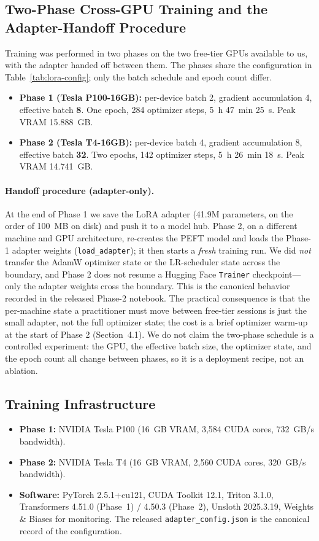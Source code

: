 \documentclass[11pt, a4paper]{article}
\begin{document}
\subsection{Two-Phase Cross-GPU Training and the Adapter-Handoff Procedure}
Training was performed in two phases on the two free-tier GPUs available to us, with the adapter handed off between them. The phases share the configuration in Table~\ref{tab:lora-config}; only the batch schedule and epoch count differ.

\begin{itemize}
    \item \textbf{Phase 1 (Tesla P100-16GB):} per-device batch 2, gradient accumulation 4, effective batch \textbf{8}. One epoch, 284 optimizer steps, 5~h 47~min 25~s. Peak VRAM 15.888~GB.
    \item \textbf{Phase 2 (Tesla T4-16GB):} per-device batch 4, gradient accumulation 8, effective batch \textbf{32}. Two epochs, 142 optimizer steps, 5~h 26~min 18~s. Peak VRAM 14.741~GB.
\end{itemize}

\paragraph{Handoff procedure (adapter-only).} At the end of Phase 1 we save the LoRA adapter (41.9M parameters, on the order of 100~MB on disk) and push it to a model hub. Phase 2, on a different machine and GPU architecture, re-creates the PEFT model and loads the Phase-1 adapter weights (\texttt{load\_adapter}); it then starts a \emph{fresh} training run. We did \emph{not} transfer the AdamW optimizer state or the LR-scheduler state across the boundary, and Phase 2 does not resume a Hugging Face \texttt{Trainer} checkpoint---only the adapter weights cross the boundary. This is the canonical behavior recorded in the released Phase-2 notebook. The practical consequence is that the per-machine state a practitioner must move between free-tier sessions is just the small adapter, not the full optimizer state; the cost is a brief optimizer warm-up at the start of Phase 2 (Section~4.1). We do not claim the two-phase schedule is a controlled experiment: the GPU, the effective batch size, the optimizer state, and the epoch count all change between phases, so it is a deployment recipe, not an ablation.

\subsection{Training Infrastructure}
\begin{itemize}
    \item \textbf{Phase 1:} NVIDIA Tesla P100 (16~GB VRAM, 3{,}584 CUDA cores, 732~GB/s bandwidth).
    \item \textbf{Phase 2:} NVIDIA Tesla T4 (16~GB VRAM, 2{,}560 CUDA cores, 320~GB/s bandwidth).
    \item \textbf{Software:} PyTorch 2.5.1+cu121, CUDA Toolkit 12.1, Triton 3.1.0, Transformers 4.51.0 (Phase~1) / 4.50.3 (Phase~2), Unsloth 2025.3.19, Weights \& Biases for monitoring. The released \texttt{adapter\_config.json} is the canonical record of the configuration.
\end{itemize}
\end{document}
